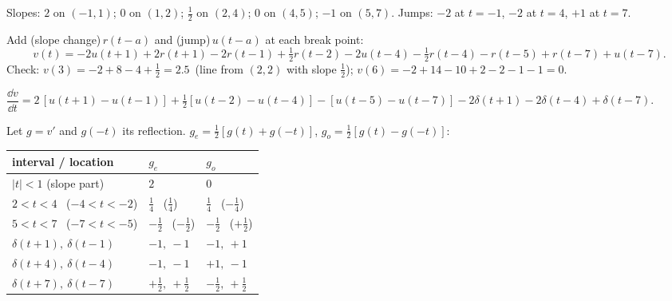 \begin{solution}
 Slopes: $2$ on $(-1,1)$; $0$ on $(1,2)$; $\frac12$ on $(2,4)$; $0$ on $(4,5)$; $-1$ on $(5,7)$. Jumps: $-2$ at $t=-1$, $-2$ at $t=4$, $+1$ at $t=7$.

 Add (slope change)$\,r(t-a)$ and (jump)$\,u(t-a)$ at each break point:
\[
v(t)=-2u(t+1)+2r(t+1)-2r(t-1)+\tfrac12r(t-2)-2u(t-4)-\tfrac12r(t-4)-r(t-5)+r(t-7)+u(t-7).
\]
Check: $v(3)=-2+8-4+\frac12=2.5$ \,(line from $(2,2)$ with slope $\frac12$); $v(6)=-2+14-10+2-2-1-1=0$.

 $\dfrac{\dd v}{\dd t}=2\,[u(t+1)-u(t-1)]+\tfrac12[u(t-2)-u(t-4)]-[u(t-5)-u(t-7)]-2\delta(t+1)-2\delta(t-4)+\delta(t-7).$

 Let $g=v'$ and $g(-t)$ its reflection. $g_e=\frac12[g(t)+g(-t)]$, $g_o=\frac12[g(t)-g(-t)]$:
\begin{center}\small\begin{tabular}{@{}lll@{}}\toprule
interval / location & $g_e$ & $g_o$\\\midrule
$|t|<1$ (slope part) & $2$ & $0$\\
$2<t<4$ \ ($-4<t<-2$) & $\frac14$ \ ($\frac14$) & $\frac14$ \ ($-\frac14$)\\
$5<t<7$ \ ($-7<t<-5$) & $-\frac12$ \ ($-\frac12$) & $-\frac12$ \ ($+\frac12$)\\
$\delta(t+1),\ \delta(t-1)$ & $-1,\ -1$ & $-1,\ +1$\\
$\delta(t+4),\ \delta(t-4)$ & $-1,\ -1$ & $+1,\ -1$\\
$\delta(t+7),\ \delta(t-7)$ & $+\frac12,\ +\frac12$ & $-\frac12,\ +\frac12$\\\bottomrule
\end{tabular}\end{center}
\begin{center}
\hspace{2mm}
\end{center}
\end{solution}
